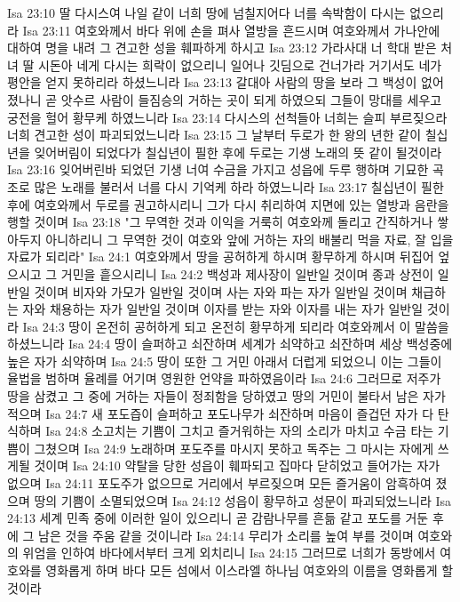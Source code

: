 Isa 23:10  딸 다시스여 나일 같이 너희 땅에 넘칠지어다 너를 속박함이 다시는 없으리라
Isa 23:11  여호와께서 바다 위에 손을 펴사 열방을 흔드시며 여호와께서 가나안에 대하여 명을 내려 그 견고한 성을 훼파하게 하시고
Isa 23:12  가라사대 너 학대 받은 처녀 딸 시돈아 네게 다시는 희락이 없으리니 일어나 깃딤으로 건너가라 거기서도 네가 평안을 얻지 못하리라 하셨느니라
Isa 23:13  갈대아 사람의 땅을 보라 그 백성이 없어졌나니 곧 앗수르 사람이 들짐승의 거하는 곳이 되게 하였으되 그들이 망대를 세우고 궁전을 헐어 황무케 하였느니라
Isa 23:14  다시스의 선척들아 너희는 슬피 부르짖으라 너희 견고한 성이 파괴되었느니라
Isa 23:15  그 날부터 두로가 한 왕의 년한 같이 칠십년을 잊어버림이 되었다가 칠십년이 필한 후에 두로는 기생 노래의 뜻 같이 될것이라
Isa 23:16  잊어버린바 되었던 기생 너여 수금을 가지고 성읍에 두루 행하며 기묘한 곡조로 많은 노래를 불러서 너를 다시 기억케 하라 하였느니라
Isa 23:17  칠십년이 필한 후에 여호와께서 두로를 권고하시리니 그가 다시 취리하여 지면에 있는 열방과 음란을 행할 것이며
Isa 23:18  "그 무역한 것과 이익을 거룩히 여호와께 돌리고 간직하거나 쌓아두지 아니하리니 그 무역한 것이 여호와 앞에 거하는 자의 배불리 먹을 자료, 잘 입을 자료가 되리라"
Isa 24:1  여호와께서 땅을 공허하게 하시며 황무하게 하시며 뒤집어 엎으시고 그 거민을 흩으시리니
Isa 24:2  백성과 제사장이 일반일 것이며 종과 상전이 일반일 것이며 비자와 가모가 일반일 것이며 사는 자와 파는 자가 일반일 것이며 채급하는 자와 채용하는 자가 일반일 것이며 이자를 받는 자와 이자를 내는 자가 일반일 것이라
Isa 24:3  땅이 온전히 공허하게 되고 온전히 황무하게 되리라 여호와께서 이 말씀을 하셨느니라
Isa 24:4  땅이 슬퍼하고 쇠잔하며 세계가 쇠약하고 쇠잔하며 세상 백성중에 높은 자가 쇠약하며
Isa 24:5  땅이 또한 그 거민 아래서 더럽게 되었으니 이는 그들이 율법을 범하며 율례를 어기며 영원한 언약을 파하였음이라
Isa 24:6  그러므로 저주가 땅을 삼켰고 그 중에 거하는 자들이 정죄함을 당하였고 땅의 거민이 불타서 남은 자가 적으며
Isa 24:7  새 포도즙이 슬퍼하고 포도나무가 쇠잔하며 마음이 즐겁던 자가 다 탄식하며
Isa 24:8  소고치는 기쁨이 그치고 즐거워하는 자의 소리가 마치고 수금 타는 기쁨이 그쳤으며
Isa 24:9  노래하며 포도주를 마시지 못하고 독주는 그 마시는 자에게 쓰게될 것이며
Isa 24:10  약탈을 당한 성읍이 훼파되고 집마다 닫히었고 들어가는 자가 없으며
Isa 24:11  포도주가 없으므로 거리에서 부르짖으며 모든 즐거움이 암흑하여 졌으며 땅의 기쁨이 소멸되었으며
Isa 24:12  성읍이 황무하고 성문이 파괴되었느니라
Isa 24:13  세계 민족 중에 이러한 일이 있으리니 곧 감람나무를 흔듦 같고 포도를 거둔 후에 그 남은 것을 주움 같을 것이니라
Isa 24:14  무리가 소리를 높여 부를 것이며 여호와의 위엄을 인하여 바다에서부터 크게 외치리니
Isa 24:15  그러므로 너희가 동방에서 여호와를 영화롭게 하며 바다 모든 섬에서 이스라엘 하나님 여호와의 이름을 영화롭게 할 것이라
